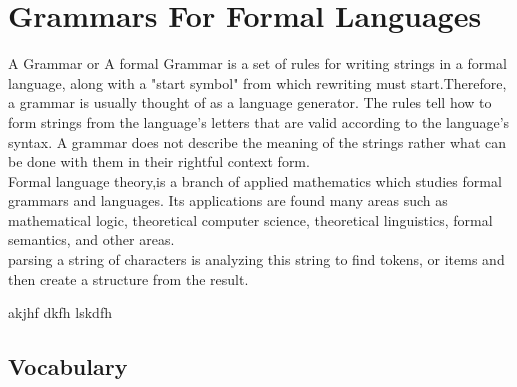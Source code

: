 
\section{Grammars For Formal Languages}

A Grammar or A formal Grammar is a set of rules for writing strings in a formal language, along with a "start symbol" from which rewriting must start.Therefore, a grammar is usually thought of as a language generator. The rules tell how to form strings from the language's letters that are valid according to the language's syntax. A grammar does not describe the meaning of the strings rather  what can be done with them in their rightful context form.\\


Formal language theory,is a branch of applied mathematics which studies formal grammars and languages. Its applications are found many areas such as mathematical logic, theoretical computer science, theoretical linguistics, formal semantics,  and other areas.\\


parsing a string of characters is analyzing this string to find tokens, or items and then create a structure from the result.


akjhf  dkfh  lskdfh 


\subsection{Vocabulary}

